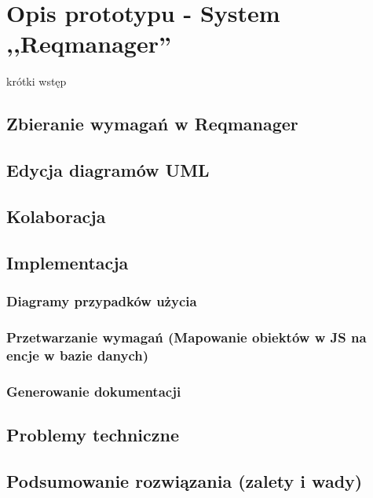 \chapter{Opis prototypu - System ,,Reqmanager''}
  
  krótki wstęp

  \section{Zbieranie wymagań w Reqmanager}
  \section{Edycja diagramów UML}
  \section{Kolaboracja}
  
  \section{Implementacja}

    \subsection{Diagramy przypadków użycia}
    \subsection{Przetwarzanie wymagań (Mapowanie obiektów w JS na encje w bazie danych)}
    \subsection{Generowanie dokumentacji}

  \section{Problemy techniczne}
  \section{Podsumowanie rozwiązania (zalety i wady)}

